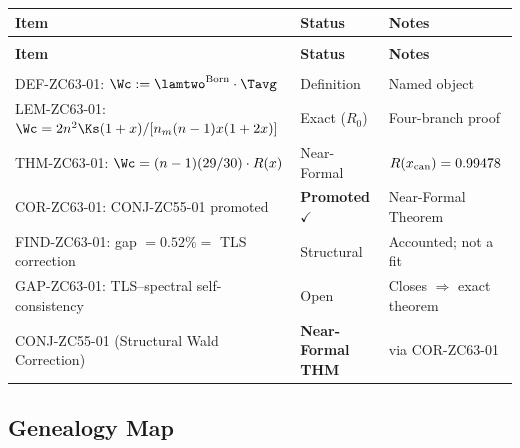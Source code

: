 \documentclass[12pt, a4paper]{article}
\begin{document}
{\small
\setlength{\LTpre}{4pt}\setlength{\LTpost}{4pt}
\renewcommand{\arraystretch}{1.30}
\begin{longtable}{>{\raggedright\arraybackslash}p{7.5cm}
                  >{\centering\arraybackslash}p{2.5cm}
                  >{\raggedright\arraybackslash}p{2.8cm}}
\toprule
\textbf{Item} & \textbf{Status} & \textbf{Notes} \\
\midrule
\endfirsthead
\multicolumn{3}{l}{\small\textit{(continued)}}\\[4pt]
\toprule
\textbf{Item} & \textbf{Status} & \textbf{Notes} \\
\midrule
\endhead
\midrule
\multicolumn{3}{r}{\small\textit{(continues)}}\\
\endfoot
\bottomrule
\endlastfoot
DEF-ZC63-01: $\Wc := \lamtwo^{\rm Born}\cdot\Tavg$
  & Definition & Named object \\[4pt]
LEM-ZC63-01: $\Wc = 2n^2\Ks(1+x)/[n_m(n-1)x(1+2x)]$
  & Exact ($R_0$) & Four-branch proof \\[4pt]
THM-ZC63-01: $\Wc = (n-1)(29/30)\cdot R(x)$
  & Near-Formal & $R(x_{\rm can})=0.99478$ \\[4pt]
COR-ZC63-01: CONJ-ZC55-01 promoted
  & \textbf{Promoted} $\checkmark$ & Near-Formal Theorem \\[4pt]
FIND-ZC63-01: gap $= 0.52\% = $ TLS correction
  & Structural & Accounted; not a fit \\[4pt]
GAP-ZC63-01: TLS--spectral self-consistency
  & Open & Closes $\Rightarrow$ exact theorem \\
\midrule
CONJ-ZC55-01 (Structural Wald Correction)
  & \textbf{Near-Formal THM} & via COR-ZC63-01 \\
\bottomrule
\end{longtable}
}

\subsection{Genealogy Map}
\label{sec:genealogy}
\end{document}
